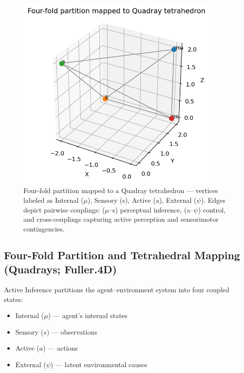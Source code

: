 \documentclass[
  10pt,
]{article}
\providecommand{\tightlist}{%
  \setlength{\itemsep}{0pt}\setlength{\parskip}{0pt}}
\begin{document}
\begin{figure}[htbp]
\centering
\includegraphics[width=0.9\textwidth]{figures/partition_tetrahedron.png}
\caption{Four-fold partition mapped to a Quadray tetrahedron — vertices labeled as Internal ($\mu$), Sensory (s), Active (a), External ($\psi$). Edges depict pairwise couplings: ($\mu$–s) perceptual inference, (a–$\psi$) control, and cross-couplings capturing active perception and sensorimotor contingencies.}
\label{fig:partition_tetrahedron}
\end{figure}

\hypertarget{four-fold-partition-and-tetrahedral-mapping-quadrays-fuller.4d}{%
\subsection{Four-Fold Partition and Tetrahedral Mapping (Quadrays;
Fuller.4D)}\label{four-fold-partition-and-tetrahedral-mapping-quadrays-fuller.4d}}

Active Inference partitions the agent--environment system into four
coupled states:

\begin{itemize}
\tightlist
\item
  Internal (\(\mu\)) --- agent's internal states
\item
  Sensory (\(s\)) --- observations
\item
  Active (\(a\)) --- actions
\item
  External (\(\psi\)) --- latent environmental causes
\end{itemize}
\end{document}
